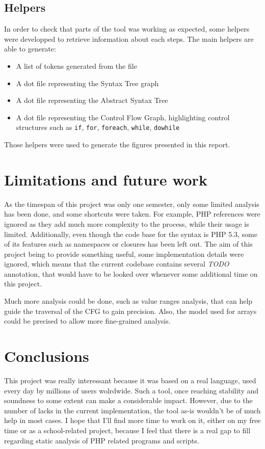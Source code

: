 \documentclass[a4paper]{article}
\begin{document}
\subsection{Helpers}
In order to check that parts of the tool was working as expected, some helpers were
developped to retrieve information about each steps. The main helpers are able to generate:
\begin{itemize}
  \item A list of tokens generated from the file
  \item A dot file representing the Syntax Tree graph
  \item A dot file representing the Abstract Syntax Tree
  \item A dot file representing the Control Flow Graph, highlighting control structures
    such as \verb=if=, \verb=for=, \verb=foreach=, \verb=while=, \verb=dowhile=
\end{itemize}

Those helpers were used to generate the figures presented in this report.

\section{Limitations and future work}
As the timespan of this project was only one semester, only some limited
analysis has been done, and some shortcuts were taken. For example, PHP
references were ignored as they add much more complexity to the process, while
their usage is limited. Additionally, even though the code base for the syntax
is PHP 5.3, some of its features such as namespaces or closures has been left
out. The aim of this project being to provide something useful, some implementation
details were ignored, which means that the current codebase contains several
\emph{TODO} annotation, that would have to be looked over whenever some
additional time on this project.

Much more analysis could be done, such as value ranges analysis, that can help
guide the traversal of the CFG to gain precision. Also, the model used for
arrays could be precised to allow more fine-grained analysis.

\section{Conclusions}
This project was really interessant because it was based on a real language, used
every day by millions of users wolrdwide. Such a tool, once reaching stability
and soundness to some extent can make a considerable impact. However, due to the
number of lacks in the current implementation, the tool as-is wouldn't be of
much help in most cases. I hope that I'll find more time to work on it, either
on my free time or as a school-related project, because I feel that there is a
real gap to fill regarding static analysis of PHP related programs and scripts.
\end{document}
